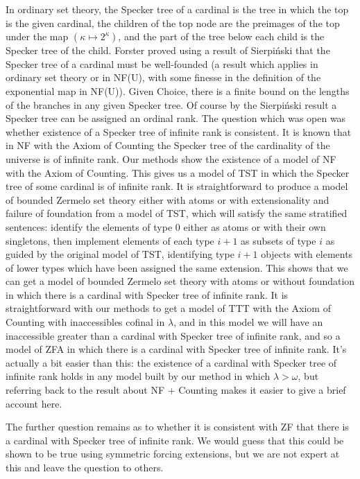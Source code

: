 \documentclass{article}
\theoremstyle{definition}
\theoremstyle{remark}
\begin{document}
In ordinary set theory, the Specker tree of a cardinal is the tree in which the top is the given cardinal, the children of the top node  are the preimages of the top under the map $(\kappa \mapsto 2^{\kappa})$, and the part of the tree
below each child is the Specker tree of the child.  Forster proved using a result of Sierpi\'nski that the Specker tree of a cardinal must be well-founded (a result which applies in ordinary set theory or in NF(U), with some finesse in the definition of the exponential map in NF(U)).  Given Choice, there is a finite bound on the lengths of the branches in any given Specker tree.  Of course by the Sierpi\'nski result a Specker tree can be assigned an ordinal rank.  The question which was open
was whether existence of a Specker tree of infinite rank is consistent.  It is known that in NF with the Axiom of Counting the Specker tree of the cardinality of the universe is of infinite rank.   Our methods show the existence of a model of NF with the Axiom of Counting.  This gives us a model of TST in which the Specker tree of some cardinal is of infinite rank.  It is straightforward to produce a model of bounded Zermelo set theory either with atoms or with extensionality and failure of foundation from a model of TST, which will satisfy the same stratified sentences:  identify the elements of type 0 either as atoms or with their own singletons, then implement elements of each type $i+1$ as subsets of type $i$ as guided by the original model of TST, identifying type $i+1$ objects with elements of lower types which have been assigned the same extension.  This shows that we can get a model of bounded Zermelo set theory with atoms or without foundation in which there is a cardinal with Specker tree of infinite rank.  It is straightforward with our methods to get a model of TTT with the Axiom of Counting with inaccessibles cofinal in $\lambda$, and in this model we will have an inaccessible greater than a cardinal with Specker tree of infinite rank,
and so a model of ZFA in which there is a cardinal with Specker tree of infinite rank.  It's actually a bit easier than this:  the existence of a cardinal with Specker tree of infinite rank holds in any model built by our method in which $\lambda>\omega$, but referring back to the result about NF + Counting makes it easier to give a brief account here.

The further question remains as to whether it is consistent with ZF that there is a cardinal with Specker tree of infinite rank.  We would guess that this could be shown to be true using symmetric forcing extensions, but we are not expert at this and leave the question to others.
\end{document}
